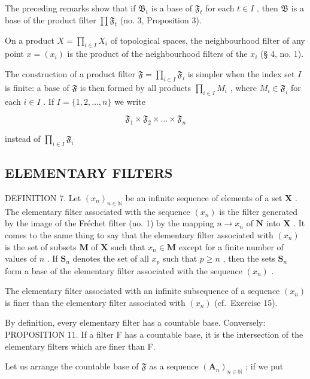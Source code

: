 The preceding remarks show that if \(\mathfrak{B}_{t}\) is a base of \(\mathfrak{F}_{t}\) for each \(t\in I\) , then \(\mathfrak{B}\) is a base of the product filter \(\prod \mathfrak{F}_{t}\) (no. 3, Proposition 3).

On a product \(X = \prod_{i \in I} X_i\) of topological spaces, the neighbourhood filter of any point \(x = (x_i)\) is the product of the neighbourhood filters of the \(x_i\) (§ 4, no. 1).

The construction of a product filter \(\mathfrak{F} = \prod_{i\in I}\mathfrak{F}_i\) is simpler when the index set \(I\) is finite: a base of \(\mathfrak{F}\) is then formed by all products \(\prod_{i\in I}M_i\) , where \(M_i\in \mathfrak{F}_i\) for each \(i\in I\) . If \(I = \{1,2,\ldots,n\}\) we write

\[
\mathfrak {F} _ {1} \times \mathfrak {F} _ {2} \times \dots \times \mathfrak {F} _ {n}
\]

instead of \(\prod_{i\in I}\mathfrak{F}_i\)

\subsection{ELEMENTARY FILTERS}

DEFINITION 7. Let \((x_{n})_{n\in \mathbb{N}}\) be an infinite sequence of elements of a set \(\mathbf{X}\) . The elementary filter associated with the sequence \((x_{n})\) is the filter generated by the image of the Fréchet filter (no. 1) by the mapping \(n\to x_n\) of \(\mathbf{N}\) into \(\mathbf{X}\) . It comes to the same thing to say that the elementary filter associated with \((x_{n})\) is the set of subsets \(\mathbf{M}\) of \(\mathbf{X}\) such that \(x_{n}\in \mathbf{M}\) except for a finite number of values of \(n\) . If \(\mathbf{S}_n\) denotes the set of all \(x_{p}\) such that \(p\geqslant n\) , then the sets \(\mathbf{S}_n\) form a base of the elementary filter associated with the sequence \((x_{n})\) .

The elementary filter associated with an infinite subsequence of a sequence \((x_{n})\) is finer than the elementary filter associated with \((x_{n})\) (cf.~Exercise 15).

By definition, every elementary filter has a countable base. Conversely: PROPOSITION 11. If a filter F has a countable base, it is the intersection of the elementary filters which are finer than F.

Let us arrange the countable base of \(\mathfrak{F}\) as a sequence \((\mathbf{A}_n)_{n\in \mathbb{N}}\) ; if we put

